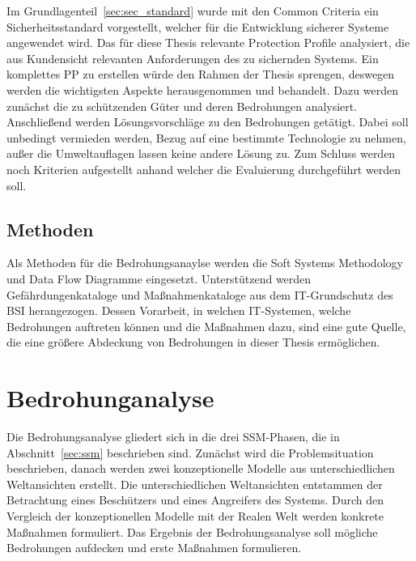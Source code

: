 \documentclass[11pt,a4paper]{report}
\begin{document}
Im Grundlagenteil~\ref{sec:sec_standard} wurde mit den Common Criteria ein Sicherheitsstandard vorgestellt, welcher für die Entwicklung sicherer Systeme angewendet wird. Das für diese Thesis relevante Protection Profile analysiert, die aus Kundensicht relevanten Anforderungen des zu sichernden Systems. Ein komplettes PP zu erstellen würde den Rahmen der Thesis sprengen, deswegen werden die wichtigsten Aspekte herausgenommen und behandelt. Dazu werden zunächst die zu schützenden Güter und deren Bedrohungen analysiert. Anschließend werden Lösungsvorschläge zu den Bedrohungen getätigt. Dabei soll unbedingt vermieden werden, Bezug auf eine bestimmte Technologie zu nehmen, außer die Umweltauflagen lassen keine andere Lösung zu. Zum Schluss werden noch Kriterien aufgestellt anhand welcher die Evaluierung durchgeführt werden soll.

\section{Methoden}

Als Methoden für die Bedrohungsanaylse werden die Soft Systems Methodology und Data Flow Diagramme eingesetzt. Unterstützend werden Gefährdungenkataloge und Maßnahmenkataloge aus dem IT-Grundschutz des BSI herangezogen. Dessen Vorarbeit, in welchen IT-Systemen, welche Bedrohungen auftreten können und die Maßnahmen dazu, sind eine gute Quelle, die eine größere Abdeckung von Bedrohungen in dieser Thesis ermöglichen.

\chapter{Bedrohunganalyse} \label{chap:threat_analysis}

Die Bedrohungsanalyse gliedert sich in die drei SSM-Phasen, die in Abschnitt~\ref{sec:ssm} beschrieben sind. Zunächst wird die Problemsituation beschrieben, danach werden zwei konzeptionelle Modelle aus unterschiedlichen Weltansichten erstellt. Die unterschiedlichen Weltansichten entstammen der Betrachtung eines Beschützers und eines Angreifers des Systems. Durch den Vergleich der konzeptionellen Modelle mit der Realen Welt werden konkrete Maßnahmen formuliert. Das Ergebnis der Bedrohungsanalyse soll mögliche Bedrohungen aufdecken und erste Maßnahmen formulieren.
\end{document}
